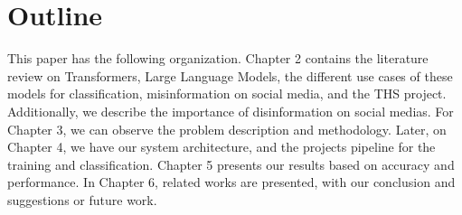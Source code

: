 \section{Outline}
\noindent
This paper has the following organization. Chapter 2 contains the literature review on Transformers, Large Language Models,
the different use cases of these models for classification, misinformation on social media, and the THS project. Additionally, we describe the
importance of disinformation on social medias. For Chapter 3, we can observe the problem description and methodology.
Later, on Chapter 4, we have our system architecture, and the projects pipeline for the training and classification. Chapter 5 presents
our results based on accuracy and performance. In Chapter 6, related works are presented, with our conclusion and suggestions 
or future work.